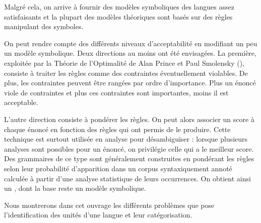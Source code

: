 Malgré cela, on arrive à fournir des modèles symboliques des langues assez satisfaisants et la plupart des modèles théoriques sont basés sur des règles manipulant des symboles.

On peut rendre compte des différents niveaux d’acceptabilité en modifiant un peu un modèle symbolique. Deux directions au moins ont été envisagées. La première, exploitée par la Théorie de l’Optimalité de Alan Prince et Paul Smolensky (\citeyear{PrinceSmolensky1993}), consiste à traiter les règles comme des contraintes éventuellement violables. De plus, les contraintes peuvent être rangées par ordre d’importance. Plus un énoncé viole de contraintes et plus ces contraintes sont importantes, moins il est acceptable.

L’autre direction consiste à pondérer les règles. On peut alors associer un score à chaque énoncé en fonction des règles qui ont permis de le produire. Cette technique est surtout utilisée en analyse pour désambiguïser : lorsque plusieurs analyses sont possibles pour un énoncé, on privilégie celle qui a le meilleur score. Des grammaires de ce type sont généralement construites en pondérant les règles selon leur probabilité d’apparition dans un corpus syntaxiquement annoté calculée à partir d’une analyse statistique de leurs occurrences. On obtient ainsi un , dont la base reste un modèle symbolique.

Nous montrerons dans cet ouvrage les différents problèmes que pose l’identification des unités d’une langue et leur catégorisation.

